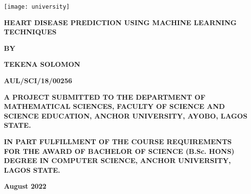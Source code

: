 
\begin{titlepage}
	\begin{center}
		\doublespacing
		
		\texttt{[image: university]}
		
		\vspace*{1cm}
		
		\textbf{\large{HEART DISEASE PREDICTION USING MACHINE LEARNING TECHNIQUES}}
		
		
		\vfill
		\textbf{BY}
		
		\vfill
		
		\textbf{\large{TEKENA SOLOMON}}
		
		\vspace{0.5cm}
		\textbf{AUL/SCI/18/00256}
		
		\vspace{1.5cm}
		\textbf{A PROJECT SUBMITTED TO THE DEPARTMENT OF MATHEMATICAL SCIENCES, FACULTY OF SCIENCE AND SCIENCE EDUCATION, ANCHOR UNIVERSITY, AYOBO, LAGOS STATE.}
		\vspace{1.5cm}
		
		\textbf{IN PART FULFILLMENT OF THE COURSE REQUIREMENTS FOR THE AWARD OF BACHELOR OF SCIENCE (B.Sc. HONS) DEGREE IN COMPUTER SCIENCE, ANCHOR UNIVERSITY, LAGOS STATE.}
		
		\vspace{0.8cm}
		
		\textbf{August 2022}
	\end{center}
\end{titlepage}

\restoregeometry
